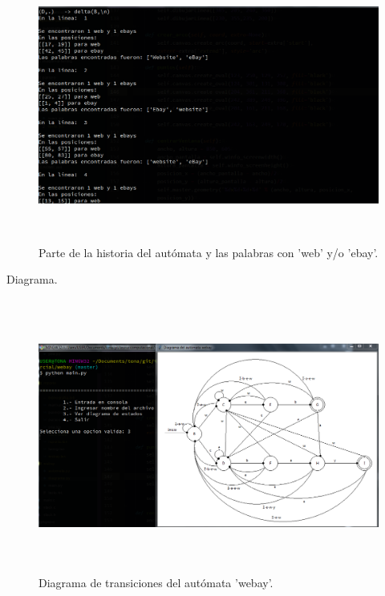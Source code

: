 \begin{figure}[H]
	\begin{center}
		\includegraphics[width=\linewidth, height=9cm]{img/webay-automatico2.png}
		\caption{Parte de la historia del autómata y las palabras con 'web' y/o 'ebay'.}
		\label{fig:webay3}
	\end{center}
\end{figure}
	{\large Diagrama.}
	\begin{figure}[H]
		\begin{center}
			\includegraphics[width=\linewidth, height=9cm]{img/webay-diagrama.png}
			\caption{Diagrama de transiciones del autómata 'webay'.}
			\label{fig:webay4}
		\end{center}
	\end{figure}

